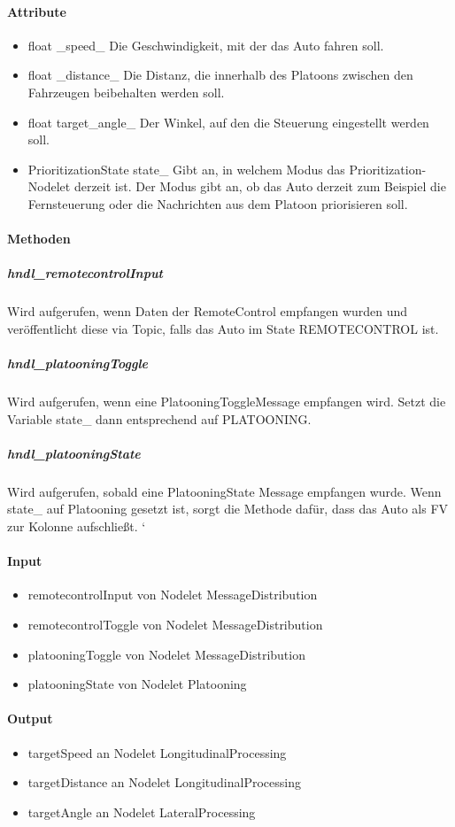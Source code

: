 \documentclass[a4paper, 12pt, titlepage]{scrartcl}
\begin{document}
				\paragraph{Attribute}
					\begin{itemize}
						\item float \_speed\_ Die Geschwindigkeit, mit der das Auto fahren soll.
						\item float \_distance\_ Die Distanz, die innerhalb des Platoons zwischen den Fahrzeugen beibehalten werden soll.
						\item float target\_angle\_ Der Winkel, auf den die Steuerung eingestellt werden soll.
						\item PrioritizationState state\_ Gibt an, in welchem Modus das Prioritization-Nodelet derzeit ist. Der Modus gibt an, ob das Auto derzeit zum Beispiel die Fernsteuerung oder die Nachrichten aus dem Platoon priorisieren soll.
					\end{itemize}
				\paragraph{Methoden}
					\subparagraph{hndl\_remotecontrolInput} Wird aufgerufen, wenn Daten der RemoteControl empfangen wurden und veröffentlicht diese via Topic, falls das Auto im State REMOTECONTROL ist.
					\subparagraph{hndl\_platooningToggle} Wird aufgerufen, wenn eine PlatooningToggleMessage empfangen wird. Setzt die Variable state\_ dann entsprechend auf PLATOONING.
					\subparagraph{hndl\_platooningState} Wird aufgerufen, sobald eine PlatooningState Message empfangen wurde. Wenn state\_ auf Platooning gesetzt ist, sorgt die Methode dafür, dass das Auto als FV zur Kolonne aufschließt. ‘
				\paragraph{Input}
				    \begin{itemize}
				        \item remotecontrolInput von Nodelet MessageDistribution
				        \item remotecontrolToggle von Nodelet MessageDistribution
				        \item platooningToggle von Nodelet MessageDistribution
				        \item platooningState von Nodelet Platooning
				    \end{itemize}
				\paragraph{Output}
				    \begin{itemize}
				        \item targetSpeed an Nodelet LongitudinalProcessing
				        \item targetDistance an Nodelet LongitudinalProcessing
				        \item targetAngle an Nodelet LateralProcessing
				    \end{itemize}
\end{document}
